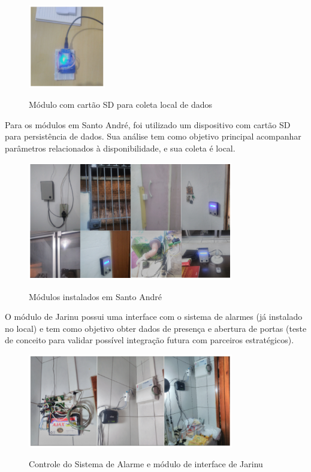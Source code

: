\begin{figure}[H]
	\centering
	\caption{Módulo com cartão SD para coleta local de dados}
	\includegraphics[width=0.3\textwidth]{SDColetaDados}
	\label{fig:SDColetaDados}
\end{figure}

Para os módulos em Santo André, foi utilizado um dispositivo com cartão SD para persistência de dados. Sua análise tem como objetivo principal acompanhar parâmetros relacionados à disponibilidade, e sua coleta é local.

\begin{figure}[H]
	\centering
	\caption{Módulos instalados em Santo André}
	\includegraphics[width=0.8\textwidth]{ModulosStoAndre}
	\label{fig:ModulosStoAndre}
\end{figure}

O módulo de Jarinu possui uma interface com o sistema de alarmes (já instalado no local) e tem como objetivo obter dados de presença e abertura de portas (teste de conceito para validar possível integração futura com parceiros estratégicos).

\begin{figure}[H]
	\centering
	\caption{Controle do Sistema de Alarme e módulo de interface de Jarinu}
	\includegraphics[width=0.8\textwidth]{ModuloSistAlarme}
	\label{fig:ModuloSistAlarme}
\end{figure}

